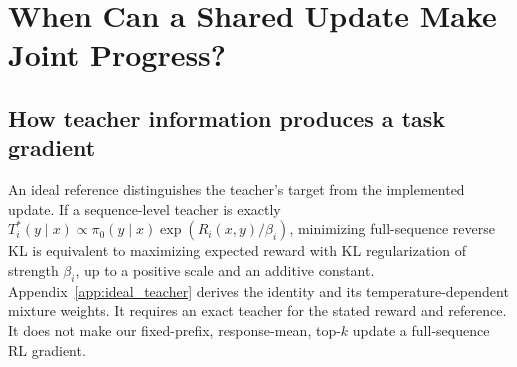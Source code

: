\section{When Can a Shared Update Make Joint Progress?}
\label{sec:theory}

\subsection{How teacher information produces a task gradient}
\label{sec:teacher_signal}

An ideal reference distinguishes the teacher's target from the implemented
update. If a sequence-level teacher is exactly
$T_i^*(y\mid x)\propto\pi_0(y\mid x)\exp(R_i(x,y)/\beta_i)$,
minimizing full-sequence reverse KL is equivalent to maximizing expected
reward with KL regularization of strength $\beta_i$, up to a positive
scale and an additive constant. Appendix~\ref{app:ideal_teacher} derives
the identity and its temperature-dependent mixture weights. It requires
an exact teacher for the stated reward and reference. It does not make
our fixed-prefix, response-mean, top-$k$ update a full-sequence RL gradient.

